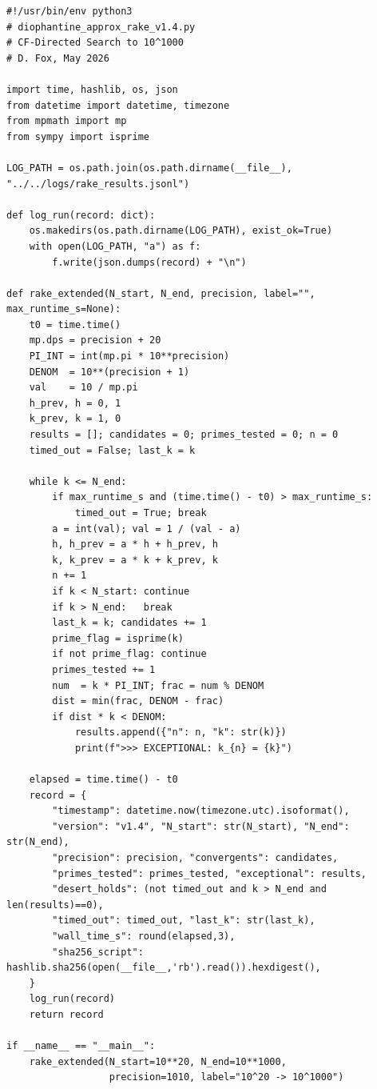 \documentclass[11pt,a4paper]{article}
\begin{document}
\begin{lstlisting}
#!/usr/bin/env python3
# diophantine_approx_rake_v1.4.py
# CF-Directed Search to 10^1000
# D. Fox, May 2026

import time, hashlib, os, json
from datetime import datetime, timezone
from mpmath import mp
from sympy import isprime

LOG_PATH = os.path.join(os.path.dirname(__file__), "../../logs/rake_results.jsonl")

def log_run(record: dict):
    os.makedirs(os.path.dirname(LOG_PATH), exist_ok=True)
    with open(LOG_PATH, "a") as f:
        f.write(json.dumps(record) + "\n")

def rake_extended(N_start, N_end, precision, label="", max_runtime_s=None):
    t0 = time.time()
    mp.dps = precision + 20
    PI_INT = int(mp.pi * 10**precision)
    DENOM  = 10**(precision + 1)
    val    = 10 / mp.pi
    h_prev, h = 0, 1
    k_prev, k = 1, 0
    results = []; candidates = 0; primes_tested = 0; n = 0
    timed_out = False; last_k = k

    while k <= N_end:
        if max_runtime_s and (time.time() - t0) > max_runtime_s:
            timed_out = True; break
        a = int(val); val = 1 / (val - a)
        h, h_prev = a * h + h_prev, h
        k, k_prev = a * k + k_prev, k
        n += 1
        if k < N_start: continue
        if k > N_end:   break
        last_k = k; candidates += 1
        prime_flag = isprime(k)
        if not prime_flag: continue
        primes_tested += 1
        num  = k * PI_INT; frac = num % DENOM
        dist = min(frac, DENOM - frac)
        if dist * k < DENOM:
            results.append({"n": n, "k": str(k)})
            print(f">>> EXCEPTIONAL: k_{n} = {k}")

    elapsed = time.time() - t0
    record = {
        "timestamp": datetime.now(timezone.utc).isoformat(),
        "version": "v1.4", "N_start": str(N_start), "N_end": str(N_end),
        "precision": precision, "convergents": candidates,
        "primes_tested": primes_tested, "exceptional": results,
        "desert_holds": (not timed_out and k > N_end and len(results)==0),
        "timed_out": timed_out, "last_k": str(last_k),
        "wall_time_s": round(elapsed,3),
        "sha256_script": hashlib.sha256(open(__file__,'rb').read()).hexdigest(),
    }
    log_run(record)
    return record

if __name__ == "__main__":
    rake_extended(N_start=10**20, N_end=10**1000,
                  precision=1010, label="10^20 -> 10^1000")
\end{lstlisting}
\end{document}
